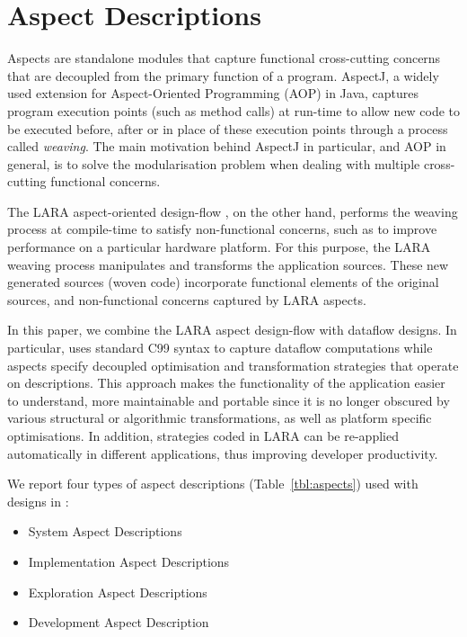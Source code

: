 \chapter{Aspect Descriptions}
\label{sec:aspects}

Aspects are standalone modules that capture functional cross-cutting
concerns that are decoupled from the primary function of a
program. AspectJ\cite{Kiczales:2005:AP:1062455.1062640}, a widely used
extension for Aspect-Oriented Programming (AOP) in Java, captures
program execution points (such as method calls) at run-time to allow
new code to be executed before, after or in place of these execution
points through a process called \emph{weaving}. The main motivation
behind AspectJ in particular, and AOP in general, is to solve the
modularisation problem when dealing with multiple cross-cutting
functional concerns.

The LARA aspect-oriented design-flow
\cite{Cardoso:Carvalho:Cutinho:Luk:Nobre:Diniz:Petrov:2012}, on the
other hand, performs the weaving process at compile-time to satisfy
non-functional concerns, such as to improve performance on a
particular hardware platform. For this purpose, the LARA weaving
process manipulates and transforms the application sources. These new
generated sources (woven code) incorporate functional elements of the
original sources, and non-functional concerns captured by LARA
aspects.

In this paper, we combine the LARA aspect design-flow with \FAST{}
dataflow designs. In particular, \FAST{} uses standard C99 syntax to
capture dataflow computations while aspects specify decoupled
optimisation and transformation strategies that operate on \FAST{}
descriptions. This approach makes the functionality of the application
easier to understand, more maintainable and portable since it is no
longer obscured by various structural or algorithmic transformations,
as well as platform specific optimisations. In addition, strategies
coded in LARA can be re-applied automatically in different
applications, thus improving developer productivity.

We report four types of aspect descriptions (Table~\ref{tbl:aspects}) used with
designs in \FAST{}:

\begin{itemize}
  \item System Aspect Descriptions
  \item Implementation Aspect Descriptions
  \item Exploration Aspect Descriptions
  \item Development Aspect Description
\end{itemize}

